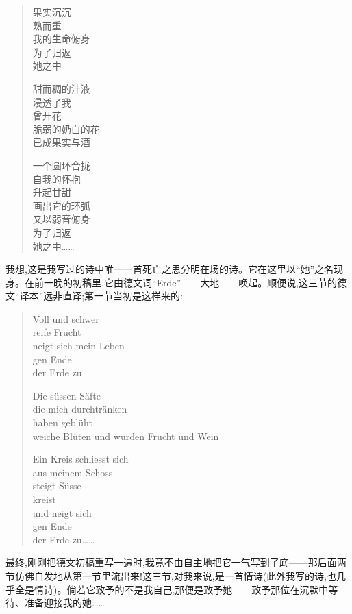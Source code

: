 \begin{quote}\raggedright
果实沉沉\\
熟而重\\
我的生命俯身\\
为了归返\\
她之中\par\medskip
甜而稠的汁液\\
浸透了我\\
曾开花\\
脆弱的奶白的花\\
已成果实与酒\par\medskip
一个圆环合拢——\\
自我的怀抱\\
升起甘甜\\
画出它的环弧\\
又以弱音俯身\\
为了归返\\
她之中……
\end{quote}

我想,这是我写过的诗中唯一一首死亡之思分明在场的诗。它在这里以“她”之名现身。在前一晚的初稿里,它由德文词“Erde”——大地——唤起。顺便说,这三节的德文“译本”远非直译;第一节当初是这样来的:

\begin{quote}\raggedright
Voll und schwer\\
reife Frucht\\
neigt sich mein Leben\\
gen Ende\\
der Erde zu\par\medskip
Die süssen Säfte\\
die mich durchtränken\\
haben geblüht\\
weiche Blüten und wurden Frucht und Wein\par\medskip
Ein Kreis schliesst sich\\
aus meinem Schoss\\
steigt Süsse\\
kreist\\
und neigt sich\\
gen Ende\\
der Erde zu……
\end{quote}

\dmark{}最终,刚刚把德文初稿重写一遍时,我竟不由自主地把它一气写到了底——那后面两节仿佛自发地从第一节里流出来!这三节,对我来说,是一首情诗(此外我写的诗,也几乎全是情诗)。倘若它致予的不是我自己,那便是致予她——致予那位在沉默中等待、准备迎接我的她……

